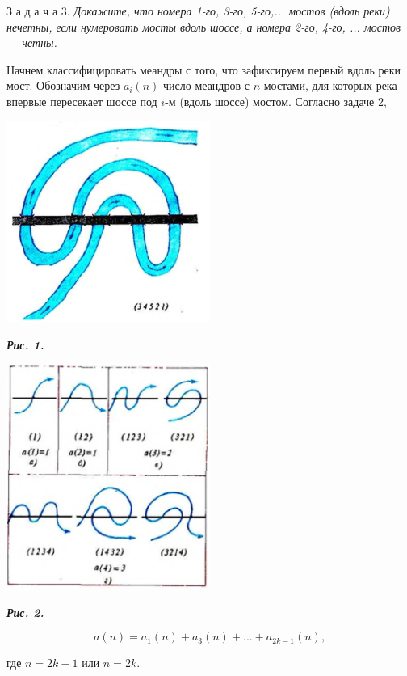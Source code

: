 \documentclass[Main.tex]{subfiles}
\begin{document}
\begin{multicols}{2}
З а д а ч а 3. \textit{Докажите, что номера 1-го, 3-го, 5-го,... мостов (вдоль реки) нечетны, если нумеровать мосты вдоль шоссе, а номера 2-го, 4-го, ... мостов — четны.}

Начнем классифицировать меандры с того, что зафиксируем первый вдоль реки мост. Обозначим через $a_i(n)$ число меандров с $n$ мостами, для которых река впервые пересекает шоссе под $i$-м (вдоль шоссе) мостом. Согласно задаче 2,

\includegraphics[width=0.5\textwidth]{../images/../images/Picture1}

\begin{flushleft}\textbf{\textit{\small{Рис. 1.}}}\end{flushleft}

\includegraphics[width=0.5\textwidth]{../images/Picture2}

\begin{flushleft}\textbf{\textit{\small{Рис. 2.}}}\end{flushleft}

\newpage

$$
a(n) = a_1(n) + a_3(n) + ... + a_{2k-1}(n),
$$

\noindent где $n = 2k - 1$ или $n = 2k$.


\end{multicols}
\end{document}
